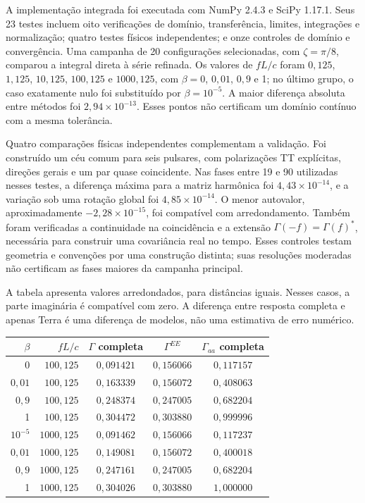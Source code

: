 A implementação integrada foi executada com NumPy 2.4.3 e SciPy 1.17.1.
Seus 23 testes incluem oito verificações de domínio, transferência,
limites, integrações e normalização; quatro testes físicos independentes;
e onze controles de domínio e convergência. Uma campanha de 20 configurações selecionadas, com
\(\zeta=\pi/8\), comparou a integral direta à série refinada.
Os valores de \(fL/c\) foram \(0{,}125\), \(1{,}125\),
\(10{,}125\), \(100{,}125\) e \(1000{,}125\), com
\(\beta=0\), \(0{,}01\), \(0{,}9\) e 1; no último grupo,
o caso exatamente nulo foi substituído por \(\beta=10^{-5}\).
A maior diferença absoluta entre métodos foi
\(2{,}94\times10^{-13}\). Esses pontos não certificam um domínio
contínuo com a mesma tolerância.

Quatro comparações físicas independentes complementam a validação. Foi
construído um céu comum para seis pulsares, com polarizações TT
explícitas, direções gerais e um par quase coincidente. Nas fases
entre 19 e 90 utilizadas nesses testes, a diferença máxima para a
matriz harmônica foi \(4{,}43\times10^{-14}\), e a variação
sob uma rotação global foi \(4{,}85\times10^{-14}\). O menor
autovalor, aproximadamente \(-2{,}28\times10^{-15}\), foi
compatível com arredondamento. Também foram verificadas a
continuidade na coincidência e a extensão
\(\Gamma(-f)=\Gamma(f)^*\), necessária para construir uma
covariância real no tempo. Esses controles testam geometria e
convenções por uma construção distinta; suas resoluções moderadas
não certificam as fases maiores da campanha principal.

A tabela apresenta valores arredondados, para distâncias iguais.
Nesses casos, a parte imaginária é compatível com zero. A diferença
entre resposta completa e apenas Terra é uma diferença de modelos,
não uma estimativa de erro numérico.

\begin{center}
\begingroup\small\singlespacing
\setlength{\tabcolsep}{5pt}
\begin{tabular}{@{}rrccc@{}}
\toprule
\(\beta\) & \(fL/c\) & \(\Gamma\) completa &
\(\Gamma^{EE}\) & \(\Gamma_{aa}\) completa\\
\midrule
0 & \(100{,}125\) & \(0{,}091421\) & \(0{,}156066\) & \(0{,}117157\)\\
\(0{,}01\) & \(100{,}125\) & \(0{,}163339\) & \(0{,}156072\) & \(0{,}408063\)\\
\(0{,}9\) & \(100{,}125\) & \(0{,}248374\) & \(0{,}247005\) & \(0{,}682204\)\\
1 & \(100{,}125\) & \(0{,}304472\) & \(0{,}303880\) & \(0{,}999996\)\\
\(10^{-5}\) & \(1000{,}125\) & \(0{,}091462\) & \(0{,}156066\) & \(0{,}117237\)\\
\(0{,}01\) & \(1000{,}125\) & \(0{,}149081\) & \(0{,}156072\) & \(0{,}400018\)\\
\(0{,}9\) & \(1000{,}125\) & \(0{,}247161\) & \(0{,}247005\) & \(0{,}682204\)\\
1 & \(1000{,}125\) & \(0{,}304026\) & \(0{,}303880\) & \(1{,}000000\)\\
\bottomrule
\end{tabular}
\endgroup
\end{center}

